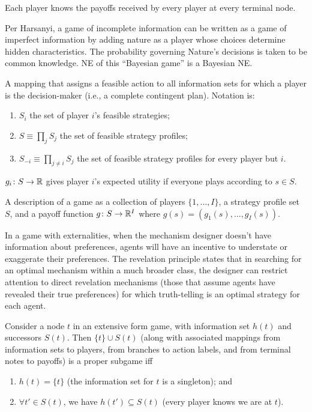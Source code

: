 \documentclass[8pt,letterpaper, landscape]{extarticle} %
\begin{document}
\begin{multicols}{3}
\begin{description}
  Each player knows the payoffs received by every player at every terminal node.

Per Harsanyi, a game of incomplete information can be written as a game of imperfect information by adding nature as a player whose choices determine hidden characteristics. The probability governing Nature's decisions is taken to be common knowledge. NE of this ``Bayesian game'' is a Bayesian NE.

 A mapping that assigns a feasible action to all information sets for which a player is the decision-maker (i.e., a complete contingent plan). Notation is:
\begin{enumerate}
\item $ S_i $ the set of player $ i $'s feasible strategies;
\item $ S \equiv \prod_{j} S_j $ the set of feasible strategy profiles;
\item $ S_{-i} \equiv \prod_{j \neq i} S_j $ the set of feasible strategy profiles for every player but $ i $.
\end{enumerate}

 $ g_i \colon S \to \mathbb{R} $ gives player $ i $'s expected utility if everyone plays according to $ s \in S $.

 A description of a game as a collection of players $ \{ 1 , \dotsc , I \} $, a strategy profile set $ S $, and a payoff function $ g \colon S \to \mathbb{R}^I $ where $ g(s) = (g_1 (s) , \dotsc , g_I (s)) $.

 In a game with externalities, when the mechanism designer doesn't have information about preferences, agents will have an incentive to understate or exaggerate their preferences. The revelation principle states that in searching for an optimal mechanism within a much broader class, the designer can restrict attention to direct revelation mechanisms (those that assume agents have revealed their true preferences) for which truth-telling is an optimal strategy for each agent.

 Consider a node $ t $ in an extensive form game, with information set $ h(t) $ and successors $ S(t) $. Then $ \{ t \} \cup S(t) $ (along with associated mappings from information sets to players, from branches to action labels, and from terminal notes to payoffs) is a proper subgame iff
\begin{enumerate}
\item $ h(t) = \{ t \} $ (the information set for $ t $ is a singleton); and
\item $ \forall t' \in S(t) $, we have $ h(t') \subseteq S(t) $ (every player knows we are at $ t $).
\end{enumerate}


\end{description}
\end{multicols}
\end{document}
